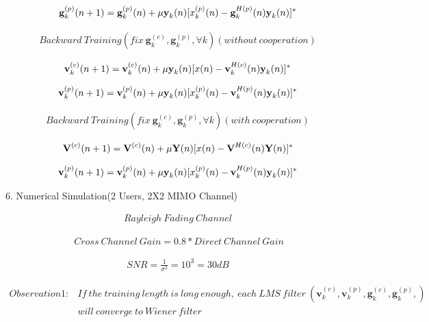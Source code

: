 \documentclass[11pt, oneside]{article}   	%
\begin{document}
\begin{align*}
\textbf{g}^{(p)}_{k}(n+1)= \textbf{g}^{(p)}_{k}(n)+ \mu \textbf y_k(n) [x_k^{(p)}(n)- \textbf{g}^{H(p)}_{k}(n) \textbf y_k(n)]^*
\end{align*}

\begin{align*}
Backward\ Training (fix\  \textbf{g}^{(c)}_{k}, \textbf{g}^{(p)}_{k}, \forall k)(without\ cooperation)
\end{align*}

\begin{align*}
\textbf{v}^{(c)}_{k}(n+1)= \textbf{v}^{(c)}_{k}(n)+ \mu \textbf y_k(n) [x(n)- \textbf{v}^{H(c)}_{k}(n) \textbf y_k(n)]^*
\end{align*}

\begin{align*}
\textbf{v}^{(p)}_{k}(n+1)= \textbf{v}^{(p)}_{k}(n)+ \mu \textbf y_k(n) [x_k^{(p)}(n)- \textbf{v}^{H(p)}_{k}(n) \textbf y_k(n)]^*
\end{align*}

\begin{align*}
Backward\ Training (fix\  \textbf{g}^{(c)}_{k}, \textbf{g}^{(p)}_{k}, \forall k)(with\ cooperation)
\end{align*}

\begin{align*}
\textbf{V}^{(c)}(n+1)= \textbf{V}^{(c)}(n)+ \mu \textbf Y(n) [x(n)- \textbf{V}^{H(c)}(n) \textbf Y(n)	]^*
\end{align*}

\begin{align*}
\textbf{v}^{(p)}_{k}(n+1)= \textbf{v}^{(p)}_{k}(n)+ \mu \textbf y_k(n) [x_k^{(p)}(n)- \textbf{v}^{H(p)}_{k}(n) \textbf y_k(n)]^*
\end{align*}

6. Numerical Simulation(2 Users, 2X2 MIMO Channel)


\begin{align*}
Rayleigh\ Fading\ Channel
\end{align*}

\begin{align*}
\ Cross\ Channel\ Gain = 0.8*Direct\ Channel\ Gain
\end{align*}

\begin{align*}
SNR = \frac {1}{\sigma^2} = 10^3=30dB
\end{align*}

\begin{align*}
Observation1: &If\ the\ training\ length\ is\ long\ enough,\ each\ LMS\ filter\ (\textbf{v}^{(c)}_{k},\textbf{v}^{(p)}_{k},\textbf{g}^{(c)}_{k},\textbf{g}^{(p)}_{k},)\\
&will\ converge\ to\ Wiener\ filter
\end{align*}
\end{document}
